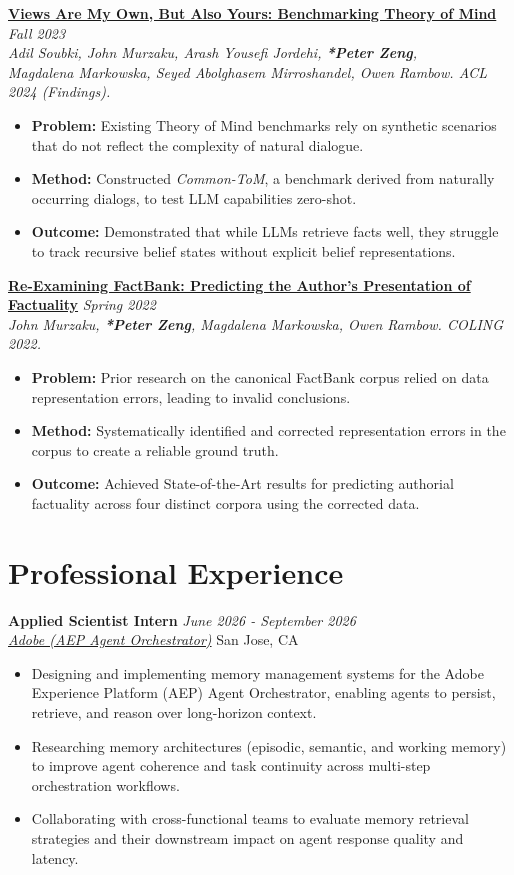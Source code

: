 \documentclass[letterpaper,10pt]{article}
\newcommand{\organization}[4]{
    \vspace{-1.0pt}
    \textbf{#1} \hfill{\emph{#2}} \\
    \emph{#3} \hfill{#4} \\
    \vspace{1.5pt} %
}
\newcommand{\bulletsBegin}{
    \vspace{1pt}
    \begin{minipage}{17.6cm} 
    \begin{itemize}[leftmargin=0.6cm]
    \setlength\itemsep{1pt} %
}
\newcommand{\bulletsEnd}{
    \end{itemize}\vspace{1pt}
    \end{minipage}
}
\begin{document}
    \organization{\href{https://arxiv.org/pdf/2403.02451}{Views Are My Own, But Also Yours: Benchmarking Theory of Mind}}{Fall 2023}
        {Adil Soubki, John Murzaku, Arash Yousefi Jordehi, \textbf{*Peter Zeng},\\ Magdalena Markowska, Seyed Abolghasem Mirroshandel, Owen Rambow. \textit{ACL 2024} (Findings).}{}
        \bulletsBegin
            \item \textbf{Problem:} Existing Theory of Mind benchmarks rely on synthetic scenarios that do not reflect the complexity of natural dialogue.
            \item \textbf{Method:} Constructed \textit{Common-ToM}, a benchmark derived from naturally occurring dialogs, to test LLM capabilities zero-shot.
            \item \textbf{Outcome:} Demonstrated that while LLMs retrieve facts well, they struggle to track recursive belief states without explicit belief representations.
        \bulletsEnd
        
    \organization{\href{https://aclanthology.org/2022.coling-1.66}{Re-Examining FactBank: Predicting the Author's Presentation of Factuality}}{Spring 2022}
        {John Murzaku, \textbf{*Peter Zeng}, Magdalena Markowska, Owen Rambow. \textit{COLING 2022}.}{}
        \bulletsBegin
            \item \textbf{Problem:} Prior research on the canonical FactBank corpus relied on data representation errors, leading to invalid conclusions.
            \item \textbf{Method:} Systematically identified and corrected representation errors in the corpus to create a reliable ground truth.
            \item \textbf{Outcome:} Achieved State-of-the-Art results for predicting authorial factuality across four distinct corpora using the corrected data.
        \bulletsEnd

    \section{Professional Experience}

    \organization{Applied Scientist Intern}{June 2026 - September 2026}
        {\href{https://business.adobe.com/products/experience-platform/adobe-experience-platform.html}{Adobe (AEP Agent Orchestrator)}}{San Jose, CA}
        \bulletsBegin
            \item Designing and implementing memory management systems for the Adobe Experience Platform (AEP) Agent Orchestrator, enabling agents to persist, retrieve, and reason over long-horizon context.
            \item Researching memory architectures (episodic, semantic, and working memory) to improve agent coherence and task continuity across multi-step orchestration workflows.
            \item Collaborating with cross-functional teams to evaluate memory retrieval strategies and their downstream impact on agent response quality and latency.
        \bulletsEnd
\end{document}

